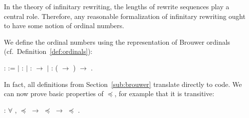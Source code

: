In the theory of infinitary rewriting, the lengths of rewrite sequences play
a central role. Therefore, any reasonable formalization of infinitary
rewriting ought to have some notion of ordinal numbers.

We define the ordinal numbers using the representation of Brouwer
ordinals (cf.~Definition~\ref{def:ordinals}):
\begin{singlespace}
\begin{coqdoccode}
\coqdocnoindent
{}  :
 :=\coqdoceol
\coqdocindent{1.00em}
\ensuremath{|}   :
\coqdoceol
\coqdocindent{1.00em}
\ensuremath{|}   :
 \ensuremath{\rightarrow}
\coqdoceol
\coqdocindent{1.00em}
\ensuremath{|}  :
(
\ensuremath{\rightarrow} )
\ensuremath{\rightarrow}
.\coqdoceol
\end{coqdoccode}
\end{singlespace}
In fact, all definitions from Section~\ref{sub:brouwer} translate directly to
\Coq code. We can now prove basic properties of $\preceq$, for example that it
is transitive:
\begin{singlespace}
\begin{coqdoccode}
\coqdocnoindent
{}
:
\ensuremath{\forall} \coqdocvar{\ensuremath{\alpha}}
\coqdocvar{\ensuremath{\beta}}
\coqdocvar{\ensuremath{\gamma}}, \coqdocvariable{\ensuremath{\alpha}}
\ensuremath{\preceq} \coqdocvariable{\ensuremath{\beta}}
\ensuremath{\rightarrow}
\coqdocvariable{\ensuremath{\beta}} \ensuremath{\preceq}
\coqdocvariable{\ensuremath{\gamma}}
\ensuremath{\rightarrow} \coqdocvariable{\ensuremath{\alpha}}
\ensuremath{\preceq}
\coqdocvariable{\ensuremath{\gamma}}.\coqdoceol
\end{coqdoccode}
\end{singlespace}

